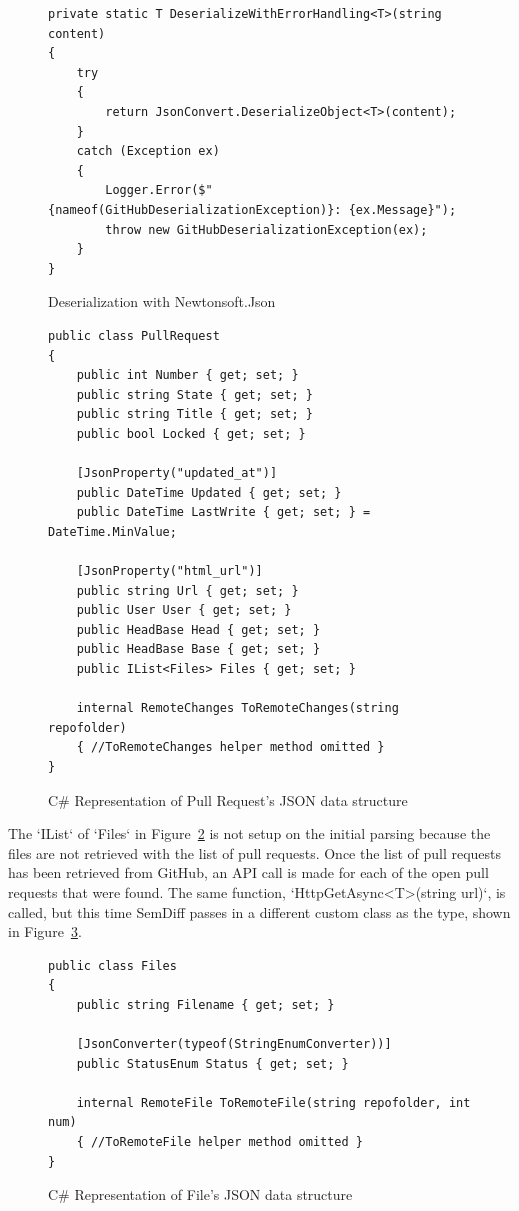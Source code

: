 \documentclass[draftclsnofoot,onecolumn]{IEEEtran}
\begin{document}
\begin{figure}[!t]
\centering
\begin{lstlisting}
private static T DeserializeWithErrorHandling<T>(string content)
{
    try
    {
        return JsonConvert.DeserializeObject<T>(content);
    }
    catch (Exception ex)
    {
        Logger.Error($"{nameof(GitHubDeserializationException)}: {ex.Message}");
        throw new GitHubDeserializationException(ex);
  	}
}
\end{lstlisting}
\caption{Deserialization with Newtonsoft.Json}
\label{deserializeNewtonsoft}
\end{figure}



\begin{figure}[!t]
\centering
\begin{lstlisting}
public class PullRequest
{
 	public int Number { get; set; }
    public string State { get; set; }
    public string Title { get; set; }
    public bool Locked { get; set; }
    
	[JsonProperty("updated_at")]
    public DateTime Updated { get; set; }
    public DateTime LastWrite { get; set; } = DateTime.MinValue;
    
	[JsonProperty("html_url")]
    public string Url { get; set; }
    public User User { get; set; }
    public HeadBase Head { get; set; }
    public HeadBase Base { get; set; }
    public IList<Files> Files { get; set; }
	
    internal RemoteChanges ToRemoteChanges(string repofolder)
    { //ToRemoteChanges helper method omitted }
}
\end{lstlisting}
\caption{C\# Representation of Pull Request’s JSON data structure}
\label{PullRequestCode}
\end{figure}

The `IList` of `Files` in Figure~\ref{PullRequestCode} is not setup on the 
initial parsing because the files are not retrieved with the list of pull 
requests. Once the list of pull requests has been retrieved from GitHub, an API 
call is made for each of the open pull requests that were found. The same 
function, `HttpGetAsync<T>(string url)`, is called, but this time SemDiff 
passes in a different custom class as the type, shown in 
Figure~\ref{GitHubFiles}.

\begin{figure}[!t]
\centering
\begin{lstlisting}
public class Files
{
    public string Filename { get; set; }
	
    [JsonConverter(typeof(StringEnumConverter))]
    public StatusEnum Status { get; set; }
	
    internal RemoteFile ToRemoteFile(string repofolder, int num)	
    { //ToRemoteFile helper method omitted }
}
\end{lstlisting}
\caption{ C\# Representation of File's JSON data structure}
\label{GitHubFiles}
\end{figure}
\end{document}
